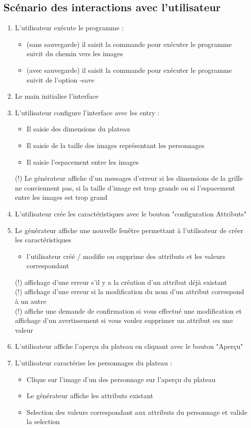 \documentclass[a4paper]{article}
\begin{document}
\subsection{Scénario des interactions avec l'utilisateur}
\begin{enumerate}
\item L'utilisateur exécute le programme : 
\begin{itemize}
    \item (sans sauvegarde) il saisit la commande pour exécuter le programme suivit du chemin vers les images
    \item (avec sauvegarde) il saisit la commande pour exécuter le programme suivit de l'option -save
\end{itemize}
\item Le main initialise l'interface
\item L'utilisateur configure l'interface avec les entry :
\begin{itemize}
    \item Il saisie des dimensions du plateau 
    \item Il saisie de la taille des images représentant les personnages
    \item Il saisie l'espacement entre les images
\end{itemize}

(!) Le générateur affiche d'un messages d'erreur si les dimensions de la grille ne conviennent pas, si la taille d'image est trop grande ou si l'espacement entre les images est trop grand
    
\item L'utilisateur crée les caractéristiques avec le bouton "configuration Attributs"
\item Le générateur affiche une nouvelle fenêtre permettant à l'utilisateur de créer les caractéristiques 
\begin{itemize}
    \item l'utilisateur créé / modifie ou supprime des attributs et les valeurs correspondant
\end{itemize}

(!) affichage d'une erreur s'il y a la création d'un attribut déjà existant\\

(!) affichage d'une erreur si la modification du nom d'un attribut correspond à un autre\\

(!) affiche une demande de confirmation si vous effectué une modification et affichage d'un avertissement si vous voulez supprimer un attribut ou une valeur
\item L'utilisateur affiche l'aperçu du plateau en cliquant avec le bouton "Aperçu"
\item L'utilisateur caractérise les personnages du plateau :
\begin{itemize}
    \item Clique sur l'image d'un des personnage sur l'aperçu du plateau 
    \item Le générateur affiche les attributs existant
    \item Selection des valeurs correspondant aux attributs du personnage et valide la selection 
\end{itemize}


\end{enumerate}
\end{document}
